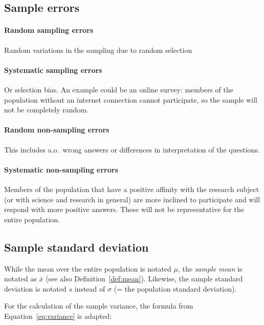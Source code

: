 \subsection{Sample errors}
\label{ssec:sample-errors}

\paragraph{Random sampling errors}

Random variations in the sampling due to random selection

\paragraph{Systematic sampling errors}

Or selection bias. An example could be an online survey: members of the population without an internet connection cannot participate, so the sample will not be completely random.

\paragraph{Random non-sampling errors}

This includes a.o.~wrong answers or differences in interpretation of the questions.

\paragraph{Systematic non-sampling errors}

Members of the population that have a positive affinity with the research subject (or with science and research in general) are more inclined to participate and will respond with more positive answers. These will not be representative for the entire population.

\subsection{Sample standard deviation}
\label{ssec:sample-standard-deviation}

While the mean over the entire population is notated $\mu$, the \emph{sample mean} is notated as $\overline{x}$ (see also Definition~\ref{def:mean}). Likewise, the sample standard deviation is notated $s$ instead of $\sigma$ (= the population standard deviation).

For the calculation of the sample variance, the formula from Equation~\ref{eq:variance} is adapted:

